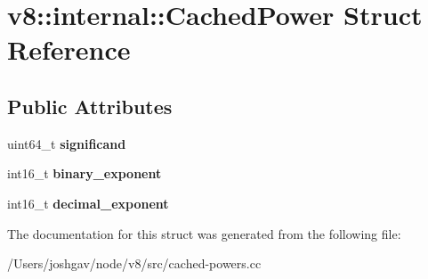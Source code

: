 \hypertarget{structv8_1_1internal_1_1_cached_power}{}\section{v8\+:\+:internal\+:\+:Cached\+Power Struct Reference}
\label{structv8_1_1internal_1_1_cached_power}
\subsection*{Public Attributes}
\begin{DoxyCompactItemize}
\item 
uint64\+\_\+t {\bfseries significand}\hypertarget{structv8_1_1internal_1_1_cached_power_a36c4e942b0d8b3c5b7905d31781f5622}{}\label{structv8_1_1internal_1_1_cached_power_a36c4e942b0d8b3c5b7905d31781f5622}

\item 
int16\+\_\+t {\bfseries binary\+\_\+exponent}\hypertarget{structv8_1_1internal_1_1_cached_power_a6259fc585c893b3372cbc393de4d73ad}{}\label{structv8_1_1internal_1_1_cached_power_a6259fc585c893b3372cbc393de4d73ad}

\item 
int16\+\_\+t {\bfseries decimal\+\_\+exponent}\hypertarget{structv8_1_1internal_1_1_cached_power_af8c120ffc417e47e2cc809b8beea2c6f}{}\label{structv8_1_1internal_1_1_cached_power_af8c120ffc417e47e2cc809b8beea2c6f}

\end{DoxyCompactItemize}


The documentation for this struct was generated from the following file\+:\begin{DoxyCompactItemize}
\item 
/\+Users/joshgav/node/v8/src/cached-\/powers.\+cc\end{DoxyCompactItemize}
